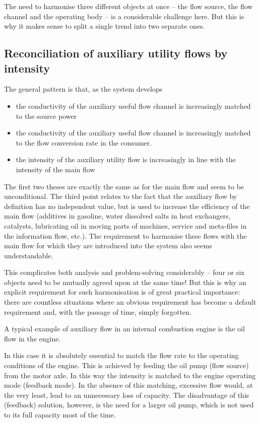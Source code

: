\documentclass[a4paper,11pt]{article}
\begin{document}
The need to harmonise three different objects at once -- the flow source, the
flow channel and the operating body -- is a considerable challenge here. But
this is why it makes sense to split a single trend into two separate ones.

\subsection{Reconciliation of auxiliary utility flows by intensity}

The general pattern is that, as the system develops
\begin{itemize}
\item the conductivity of the auxiliary useful flow channel is increasingly
  matched to the source power
\item the conductivity of the auxiliary useful flow channel is increasingly
  matched to the flow conversion rate in the consumer.
\item the intensity of the auxiliary utility flow is increasingly in line with
  the intensity of the main flow
\end{itemize}
The first two theses are exactly the same as for the main flow and seem to be
unconditional. The third point relates to the fact that the auxiliary flow by
definition has no independent value, but is used to increase the efficiency of
the main flow (additives in gasoline, water dissolved salts in heat
exchangers, catalysts, lubricating oil in moving parts of machines, service
and meta-files in the information flow, etc.). The requirement to harmonise
these flows with the main flow for which they are introduced into the system
also seems understandable.

This complicates both analysis and problem-solving considerably -- four or six
objects need to be mutually agreed upon at the same time! But this is why an
explicit requirement for such harmonisation is of great practical importance:
there are countless situations where an obvious requirement has become a
default requirement and, with the passage of time, simply forgotten.

A typical example of auxiliary flow in an internal combustion engine is the
oil flow in the engine.

In this case it is absolutely essential to match the flow rate to the
operating conditions of the engine. This is achieved by feeding the oil pump
(flow source) from the motor axle. In this way the intensity is matched to the
engine operating mode (feedback mode). In the absence of this matching,
excessive flow would, at the very least, lead to an unnecessary loss of
capacity. The disadvantage of this (feedback) solution, however, is the need
for a larger oil pump, which is not used to its full capacity most of the
time.
\end{document}
